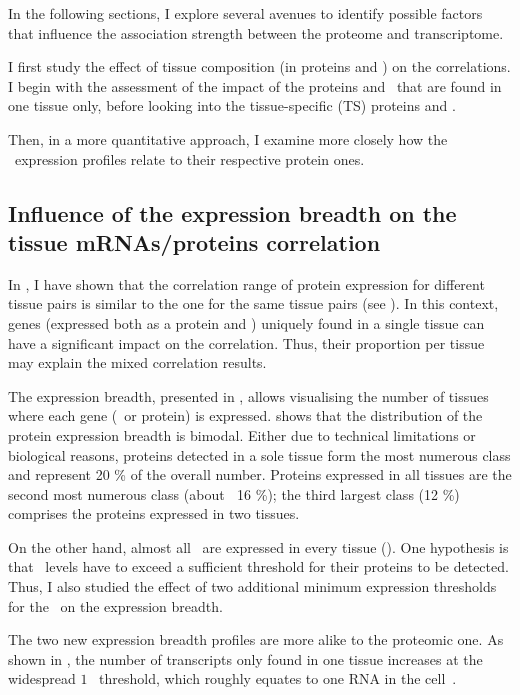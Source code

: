 In the following sections,
I explore several avenues to identify possible factors
that influence the association strength
between the proteome and transcriptome.\mybr\

I first study the effect of tissue composition (in proteins and \mRNAs)
on the correlations.
I begin with the assessment of the impact of the proteins and \mRNAs\
that are found in one tissue only,
before looking into the tissue-specific (\gls{TS}) proteins and \mRNAs{}.

Then, in a more quantitative approach,
I examine more closely how the \mRNA\ expression profiles relate
to their respective protein ones.

\subsection{Influence of the expression breadth on the tissue %
\texorpdfstring{\MakeLowercase{m}RNAs/proteins}{mRNAs/proteins} correlation}

In ,
I have shown that
the correlation range of protein expression for different tissue pairs
is similar to the one for the same tissue pairs
(see ).
In this context,
genes (expressed both as a protein and \mRNA)
uniquely found in a single tissue can have a significant impact on the correlation.
Thus, their proportion per tissue may explain
the mixed correlation results.\mybr\

The expression breadth, presented in ,
allows visualising the number of tissues
where each gene (\mRNA\ or protein) is expressed.
 shows that
the distribution of the protein expression breadth is bimodal.
Either due to technical limitations or biological reasons,
proteins detected in a sole tissue form
the most numerous class and represent 20 \% of the overall number.
Proteins expressed in all tissues are the second most numerous class (about $~$ 16 \%);
the third largest class (12 \%) comprises the proteins expressed in two tissues.\mybr\

On the other hand,
almost all \mRNAs\ are expressed in every tissue ().
One hypothesis is that \mRNAs\ levels have to exceed a sufficient threshold
for their proteins to be detected.
Thus, I also studied the effect of
two additional minimum expression thresholds for the \mRNAs\
on the expression breadth.\mybr\

The two new expression breadth profiles are more alike
to the proteomic one.
As shown in \Cref{fig:mRNAbreadth1},
the number of transcripts only found in one tissue increases
at the widespread $1$ \FPKM\ threshold,
which roughly equates to one \gls{RNA} in the cell~.

